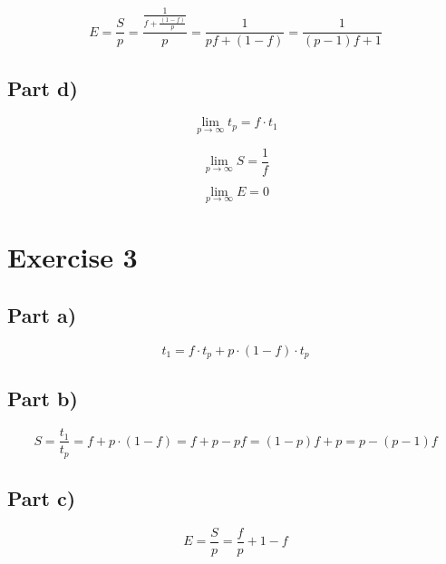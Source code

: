 \documentclass[10pt,a4paper]{article}
\begin{document}
\begin{equation*}
  E = \frac{S}{p} = \frac{\frac{1}{f + \frac{(1 - f)}{p}}}{p} = \frac{1}{pf + (1 - f)} = \frac{1}{(p - 1)f + 1}
\end{equation*}

\subsection*{Part d)}

\begin{equation*}
  \lim_{p \rightarrow \infty} t_{p} = f \cdot t_{1}
\end{equation*}

\begin{equation*}
  \lim_{p \rightarrow \infty} S = \frac{1}{f}
\end{equation*}

\begin{equation*}
  \lim_{p \rightarrow \infty} E = 0
\end{equation*}

\section*{Exercise 3}

\subsection*{Part a)}

\begin{equation*}
  t_{1} = f \cdot t_{p} + p \cdot (1 - f) \cdot t_{p}
\end{equation*}

\subsection*{Part b)}

\begin{equation*}
  S = \frac{t_{1}}{t_{p}} = f + p \cdot (1 - f) = f + p - pf = (1 - p)f + p = p - (p - 1)f
\end{equation*}

\subsection*{Part c)}

\begin{equation*}
  E = \frac{S}{p} = \frac{f}{p} + 1 - f
\end{equation*}
\end{document}
